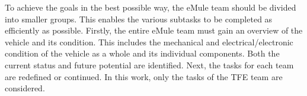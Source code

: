 To achieve the goals in the best possible way, the eMule team should be divided into smaller groups. This enables the various subtasks to be completed as efficiently as possible. Firstly, the entire eMule team must gain an overview of the vehicle and its condition. This includes the mechanical and electrical/electronic condition of the vehicle as a whole and its individual components. Both the current status and future potential are identified. Next, the tasks for each team are redefined or continued. In this work, only the tasks of the \glqq TFE team\grqq{} are considered. \newline

